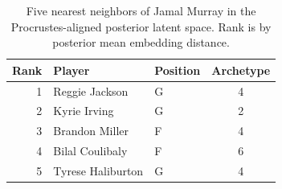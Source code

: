 \begin{table}[htbp]
  \centering\small
  \begin{tabular}{rllc}
    \toprule
    Rank & Player & Position & Archetype \\
    \midrule
    1 & Reggie Jackson & G & 4 \\
    2 & Kyrie Irving & G & 2 \\
    3 & Brandon Miller & F & 4 \\
    4 & Bilal Coulibaly & F & 6 \\
    5 & Tyrese Haliburton & G & 4 \\
    \bottomrule
  \end{tabular}
  \caption{Five nearest neighbors of Jamal Murray in the Procrustes-aligned posterior latent space. Rank is by posterior mean embedding distance.}
  \label{tab:Jamal_Murray_neighbors}
\end{table}

